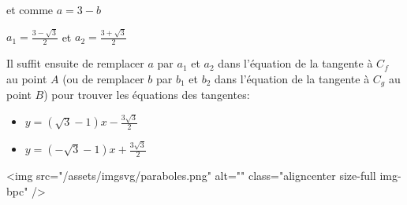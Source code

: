\begin{corrige}
          et comme $a=3-b$
          \par
          $a_{1}=\frac{3-\sqrt{3}}{2}$ et $a_{2}=\frac{3+\sqrt{3}}{2}$
          \par
          Il suffit ensuite de remplacer $a$ par $a_{1}$ et $a_{2}$ dans l'équation de la tangente à $C_{f}$ au point $A$ (ou de remplacer $b$ par $b_{1}$ et $b_{2}$ dans l'équation de la tangente à $C_{g}$ au point $B$) pour trouver les équations des tangentes:
          \begin{itemize}
               \item
               $y=\left(\sqrt{3}-1\right)x-\frac{3\sqrt{3}}{2}$
               \item
               $y=\left(-\sqrt{3}-1\right)x+\frac{3\sqrt{3}}{2}$
          \end{itemize}
          <img src="/assets/imgsvg/paraboles.png" alt="" class="aligncenter size-full  img-bpc" />

\begin{center}
\end{center}
     \end{corrige}
